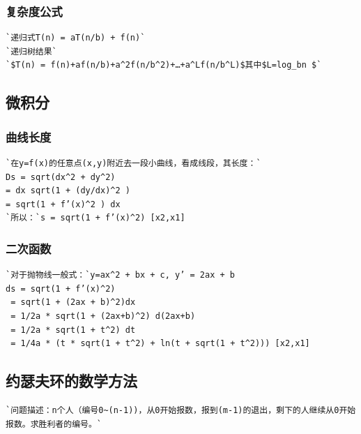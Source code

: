 \documentclass[a4paper]{article}
\begin{document}
\begin{CJK*}{UTF8}{gbsn}
\begin{multicols}{3}
\begin{flushleft}
\subsubsection{复杂度公式}
\begin{lstlisting}
`递归式T(n) = aT(n/b) + f(n)`
`递归树结果`
`$T(n) = f(n)+af(n/b)+a^2f(n/b^2)+…+a^Lf(n/b^L)$其中$L=log_bn $`
\end{lstlisting}

\subsection{微积分}

\subsubsection{曲线长度}
\begin{lstlisting}
`在y=f(x)的任意点(x,y)附近去一段小曲线，看成线段，其长度：`
Ds = sqrt(dx^2 + dy^2) 
= dx sqrt(1 + (dy/dx)^2 )
= sqrt(1 + f’(x)^2 ) dx
`所以：`s = sqrt(1 + f’(x)^2) [x2,x1]
\end{lstlisting}

\subsubsection{二次函数}
\begin{lstlisting}
`对于抛物线一般式：`y=ax^2 + bx + c, y’ = 2ax + b
ds = sqrt(1 + f’(x)^2)
 = sqrt(1 + (2ax + b)^2)dx 
 = 1/2a * sqrt(1 + (2ax+b)^2) d(2ax+b)
 = 1/2a * sqrt(1 + t^2) dt
 = 1/4a * (t * sqrt(1 + t^2) + ln(t + sqrt(1 + t^2))) [x2,x1]
\end{lstlisting}

\subsection{约瑟夫环的数学方法}
\begin{lstlisting}
`问题描述：n个人（编号0~(n-1))，从0开始报数，报到(m-1)的退出，剩下的人继续从0开始报数。求胜利者的编号。`


\end{lstlisting}
\end{flushleft}
\end{multicols}
\end{CJK*}
\end{document}
